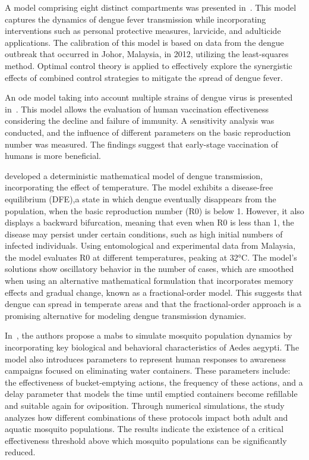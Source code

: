 A model comprising eight distinct compartments was presented
in~\cite{Abidemi2020}. This model captures the dynamics of dengue fever
transmission while incorporating interventions such as personal protective
measures, larvicide, and adulticide applications. The calibration of this model
is based on data from the dengue outbreak that occurred in Johor, Malaysia, in
2012, utilizing the least-squares method. Optimal control theory is applied to
effectively explore the synergistic effects of combined control strategies to
mitigate the spread of dengue fever.

An \gls{ode} model taking into account multiple strains of dengue virus is
presented in~\cite{Xue2021}. This model allows the evaluation of human
vaccination effectiveness considering the decline and failure of immunity. A
sensitivity analysis was conducted, and the influence of different parameters on
the basic reproduction number was measured. The findings suggest that
early-stage vaccination of humans is more beneficial.

\cite{hamdan:2021} developed a deterministic mathematical model of dengue
transmission, incorporating the effect of temperature. The model exhibits a
disease-free equilibrium (DFE),a state in which dengue eventually disappears
from the population, when the basic reproduction number (R0) is below 1.
However, it also displays a backward bifurcation, meaning that even when R0 is
less than 1, the disease may persist under certain conditions, such as high
initial numbers of infected individuals. Using entomological and experimental
data from Malaysia, the model evaluates R0 at different temperatures, peaking at
32°C. The model's solutions show oscillatory behavior in the number of cases,
which are smoothed when using an alternative mathematical formulation that
incorporates memory effects and gradual change, known as a fractional-order
model. This suggests that dengue can spread in temperate areas and that the
fractional-order approach is a promising alternative for modeling dengue
transmission dynamics.


In~\cite{Gramajo2022}, the authors propose a \gls{mabs} to simulate mosquito
population dynamics by incorporating key biological and behavioral
characteristics of Aedes aegypti. The model also introduces parameters to
represent human responses to awareness campaigns focused on eliminating water
containers. These parameters include: the effectiveness of bucket-emptying
actions, the frequency of these actions, and a delay parameter that models the
time until emptied containers become refillable and suitable again for
oviposition. Through numerical simulations, the study analyzes how different
combinations of these protocols impact both adult and aquatic mosquito
populations. The results indicate the existence of a critical effectiveness
threshold above which mosquito populations can be significantly reduced.


